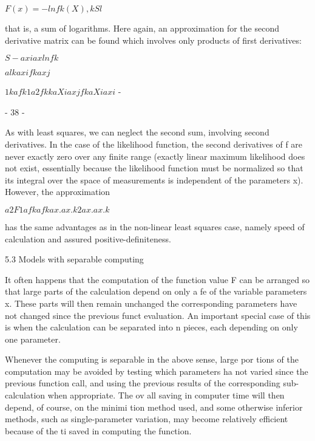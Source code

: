                          $ F(x) = -  ln fk(X) ,
                                       kSl$
 
 
that is, a sum of logarithms.  Here again, an approximation for the
second derivative matrix can be found which involves only products of
first derivatives:
 
 
                       $ S - axi ax   ln fk$
 
                        $ a l k
                        axi  f k axj$
 
                            $1 k afk 1 a2fk
                            k aXi axj     fk aXiaxi $ -
 
                                 - 38 -
 
 
As with least squares, we can neglect the second sum, involving second
derivatives.  In the case of the likelihood function, the second derivatives
of f are never exactly zero over any finite range (exactly linear
maximum likelihood does not exist, essentially because the likelihood
function must be normalized so that its integral over the space of
measurements is independent of the parameters x).  However, the
approximation
 
                        $a2F        1 afk afk
                         ax.ax.  k2 ax. ax.
                                   k$
 
 
has the same advantages as in the non-linear least squares case, namely
speed of calculation and assured positive-definiteness.
 
 
5.3  Models with separable computing
 
     It often happens that the computation of the function value F can
be arranged so that large parts of the calculation depend on only a fe
of the variable parameters x.  These parts will then remain unchanged
the corresponding parameters have not changed since the previous funct
evaluation.  An important special case of this is when the calculation
can be separated into n pieces, each depending on only one parameter.
 
     Whenever the computing is separable in the above sense, large por
tions of the computation may be avoided by testing which parameters ha
not varied since the previous function call, and using the previous
results of the corresponding sub-calculation when appropriate.  The ov
all saving in computer time will then depend, of course, on the minimi
tion method used, and some otherwise inferior methods, such as single-parameter variation, may become relatively efficient because of the ti
saved in computing the function.
 
